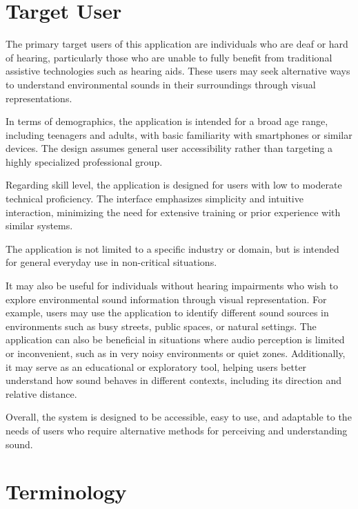 \section{Target User}
\label{section:target-user}

The primary target users of this application are individuals who are deaf or hard of hearing, 
particularly those who are unable to fully benefit from traditional assistive technologies such as hearing aids. 
These users may seek alternative ways to understand environmental sounds in their surroundings through visual representations.

In terms of demographics, the application is intended for a broad age range, including teenagers and adults, 
with basic familiarity with smartphones or similar devices. 
The design assumes general user accessibility rather than targeting a highly specialized professional group.

Regarding skill level, the application is designed for users with low to moderate technical proficiency. 
The interface emphasizes simplicity and intuitive interaction, 
minimizing the need for extensive training or prior experience with similar systems.

The application is not limited to a specific industry or domain, 
but is intended for general everyday use in non-critical situations. 

It may also be useful for individuals without hearing impairments who wish to explore environmental sound information through visual representation. 
For example, users may use the application to identify different sound sources in environments such as busy streets, public spaces, or natural settings. 
The application can also be beneficial in situations where audio perception is limited or inconvenient, 
such as in very noisy environments or quiet zones. Additionally, it may serve as an educational or exploratory tool, 
helping users better understand how sound behaves in different contexts, including its direction and relative distance.

Overall, the system is designed to be accessible, easy to use, 
and adaptable to the needs of users who require alternative methods for perceiving and understanding sound.

\section{Terminology}
\label{section:terminology}

